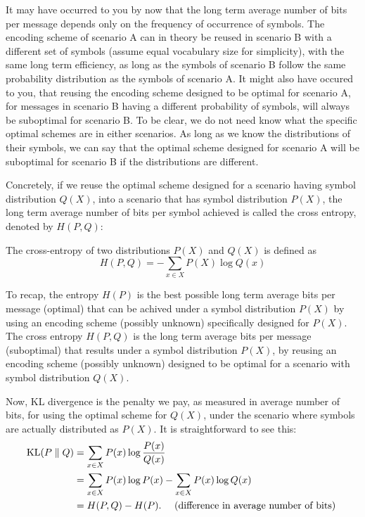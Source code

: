 \documentclass[a4paper]{article}
\begin{document}
It may have occurred to you by now that the long term average
number of bits per message depends only on the frequency of
occurrence of symbols. The encoding scheme of scenario A can
in theory be reused in scenario B with a different set of
symbols (assume equal vocabulary size for simplicity),
with the same long term efficiency, as long as the symbols
of scenario B follow the same probability distribution as the
symbols of scenario A. It might also have occured to you,
that reusing the encoding scheme designed to be optimal for
scenario A, for messages in scenario B having a different
probability of symbols, will always be suboptimal for
scenario B. To be clear, we do not need know what the
specific optimal schemes are in either scenarios. As long
as we know the distributions of their symbols, we can say
that the optimal scheme designed for scenario A will be
suboptimal for scenario B if the distributions are different.

Concretely, if we reuse the optimal scheme designed for a
scenario having symbol distribution $Q(X)$, into a scenario
that has symbol distribution $P(X)$, the long term average
number of bits per symbol achieved is called the cross entropy,
denoted by $H(P,Q)$:

\begin{defi}
  The cross-entropy of two distributions $P(X)$
  and $Q(X)$ is defined as
  \[
  H(P, Q) = - \sum_{x \in X} P(X) \log Q(x)
  \]
\end{defi}

To recap, the entropy $H(P)$ is the best possible long term
average bits per message (optimal) that can be achived under
a symbol distribution $P(X)$ by using an encoding scheme
(possibly unknown) specifically designed for $P(X)$.
The cross entropy $H(P,Q)$ is the long term average bits
per message (suboptimal) that results under a symbol
distribution $P(X)$, by reusing an encoding scheme
(possibly unknown) designed to be optimal for a scenario
with symbol distribution $Q(X)$.

Now, KL divergence is the penalty we pay, as measured in
average number of bits, for using the optimal scheme for
$Q(X)$, under the scenario where symbols are actually
distributed as $P(X)$. It is straightforward to see this:
\[
\begin{aligned}
  \operatorname{KL}(P \; \Vert \; Q)
  &= \sum_{x \in X} P(x) \log \frac{P(x)}{Q(x)} \\
  &= \sum_{x \in X} P(x) \log P(x) - \sum_{x \in X}
  P(x) \log Q(x) \\
  &= H(P, Q) - H(P).
  \quad \text{ (difference in average number of bits) }
\end{aligned}
\]
\end{document}
